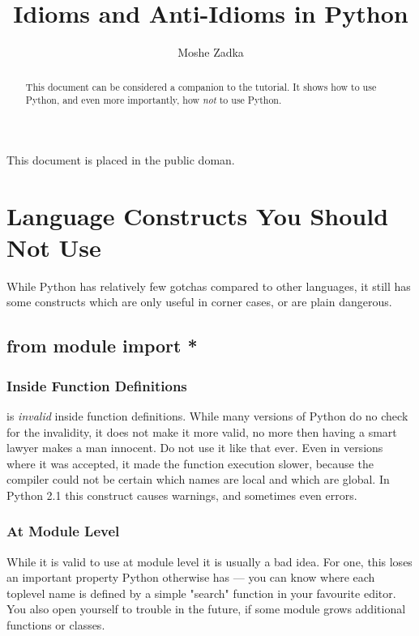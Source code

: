 \documentclass{howto}
\title{Idioms and Anti-Idioms in Python}
\author{Moshe Zadka}
\begin{document}
\maketitle

This document is placed in the public doman.

\begin{abstract}
\noindent
This document can be considered a companion to the tutorial. It
shows how to use Python, and even more importantly, how {\em not}
to use Python. 
\end{abstract}

\tableofcontents

\section{Language Constructs You Should Not Use}

While Python has relatively few gotchas compared to other languages, it
still has some constructs which are only useful in corner cases, or are
plain dangerous. 

\subsection{from module import *}

\subsubsection{Inside Function Definitions}

 is {\em invalid} inside function definitions.
While many versions of Python do no check for the invalidity, it does not
make it more valid, no more then having a smart lawyer makes a man innocent.
Do not use it like that ever. Even in versions where it was accepted, it made
the function execution slower, because the compiler could not be certain
which names are local and which are global. In Python 2.1 this construct
causes warnings, and sometimes even errors.

\subsubsection{At Module Level}

While it is valid to use  at module level it
is usually a bad idea. For one, this loses an important property Python
otherwise has --- you can know where each toplevel name is defined by
a simple "search" function in your favourite editor. You also open yourself
to trouble in the future, if some module grows additional functions or
classes. 
\end{document}
